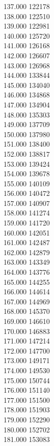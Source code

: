{ 137.000	122178 \\
 138.000	122510 \\
 139.000	122981 \\
 140.000	125720 \\
 141.000	126168 \\
 142.000	126607 \\
 143.000	126968 \\
 144.000	133844 \\
 145.000	134040 \\
 146.000	134868 \\
 147.000	134904 \\
 148.000	135303 \\
 149.000	137709 \\
 150.000	137980 \\
 151.000	138400 \\
 152.000	138817 \\
 153.000	139424 \\
 154.000	139678 \\
 155.000	140109 \\
 156.000	140472 \\
 157.000	140907 \\
 158.000	141274 \\
 159.000	141720 \\
 160.000	142051 \\
 161.000	142487 \\
 162.000	142879 \\
 163.000	143349 \\
 164.000	143776 \\
 165.000	144255 \\
 166.000	144614 \\
 167.000	144969 \\
 168.000	145370 \\
 169.000	146610 \\
 170.000	146883 \\
 171.000	147214 \\
 172.000	147700 \\
 173.000	149171 \\
 174.000	149530 \\
 175.000	150744 \\
 176.000	151140 \\
 177.000	151500 \\
 178.000	151903 \\
 179.000	152290 \\
 180.000	152702 \\
 181.000	153083 \\
}
